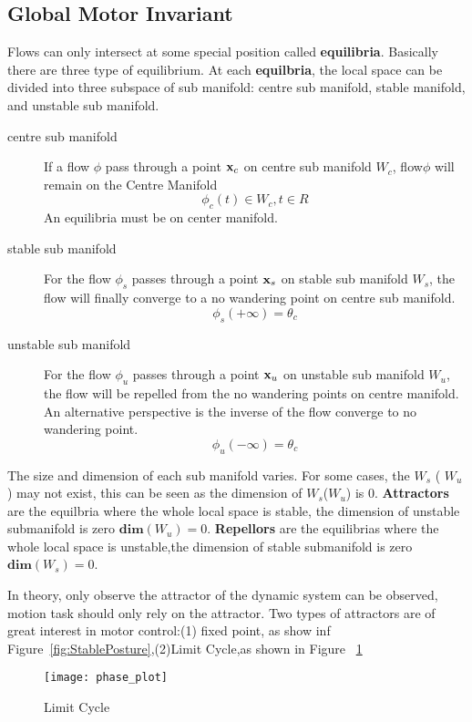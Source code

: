 \subsection{Global Motor Invariant}
Flows can only intersect at some special position called \textbf{equilibria}.
Basically there are three type of equilibrium.
At each \textbf{equilbria}, 
the local space can be divided into three subspace of sub manifold: centre sub manifold, stable manifold, and unstable sub manifold.
\begin{description} 
\item[centre sub manifold]
If a flow $\phi$ pass through a point $\mathbf{x}_{c}$ on centre sub manifold $W_{c}$,
flow$\phi$ will remain on the Centre Manifold 
\[
\phi_{c}(t) \in W_{c}, t \in R
\]
 An equilibria must be on center manifold. 
\item [stable sub manifold]
For the flow $\phi_{s}$ passes through a point $\mathbf{x}_{s}$ on stable sub manifold $W_{s}$, the flow will finally converge to a no wandering point on centre sub manifold.
\[
\phi_{s}(+\infty)=\theta_{c}
\]
\item[unstable sub manifold]
For the flow $\phi_u$ passes through a point $\mathbf{x}_u$ on unstable sub manifold $W_{u}$, the flow will be repelled from the no wandering points on centre manifold.
An alternative perspective is the inverse of the flow converge to no wandering point. 
\[
\phi_{u}(-\infty)=\theta_{c}
\] 

\end{description}

The size and dimension of each sub manifold varies.
For some cases, the $W_{s}$ ( $W_{u}$) may not exist, 
this can be seen as the dimension of $W_{s}$($W_{u}$) is $0$.
\textbf{Attractors} are the equilbria where the whole local space is stable, the dimension of unstable submanifold is zero $\mathbf{dim}(W_{u})=0$.
\textbf{Repellors} are the equilibrias where the whole local space is unstable,the dimension of stable submanifold is zero $\mathbf{dim}(W_{s})=0$.







In theory, only observe the attractor of the dynamic system can be observed, motion task should only rely on the attractor.
Two types of attractors are of great interest in motor control:(1) fixed point, as show inf Figure~\ref{fig:StablePosture},(2)Limit Cycle,as shown in Figure ~\ref{fig:limit_circle}

\begin{figure}
\begin{center}
\texttt{[image: phase\_plot]}
\end{center}
\caption{Limit Cycle}
\label{fig:limit_circle}
\end{figure}




